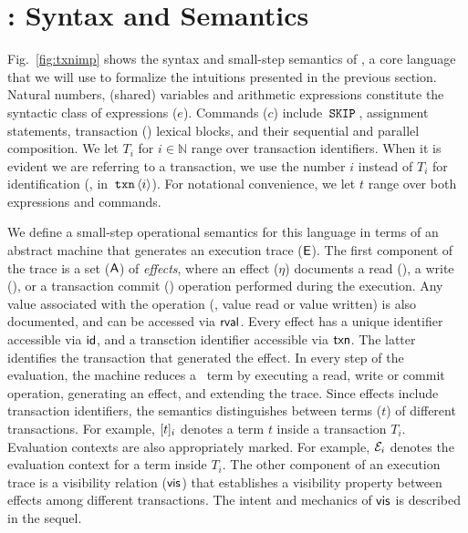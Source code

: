 \section{\txnimp: Syntax and Semantics}
\label{sec:opsem}

\label{sec:syntax}



Fig.~\ref{fig:txnimp} shows the syntax and small-step semantics of
\txnimp, a core language that we will use to formalize the intuitions
presented in the previous section. Natural numbers, (shared) variables
and arithmetic expressions constitute the syntactic class of
expressions ($e$).  Commands ($c$) include $\,{\tt SKIP}\,$, assignment
statements, transaction () lexical blocks, and their sequential
and parallel composition. We let $T_i$ for $i \in \mathbb{N}$ range
over transaction identifiers. When it is evident we are referring to a
transaction, we use the number $i$ instead of $T_i$ for identification
(\eg, in $\,{\tt txn}\,\langle i \rangle$). For notational convenience, we
let $t$ range over both expressions and commands.

We define a small-step operational semantics for this language in
terms of an abstract machine that generates an execution trace
($\textsf{E}$). The first component of the trace is a set ($\textsf{A}$) of
\emph{effects}, where an effect ($\eta$) documents a read (),
a write (), or a transaction commit () operation
performed during the execution. Any value associated with the
operation (\eg, value read or value written) is also documented, and
can be accessed via $\textsf{rval}$. Every effect has a unique identifier
accessible via $\textsf{id}$, and a transction identifier accessible via
$\textsf{txn}$.  The latter identifies the transaction that generated the
effect. In every step of the evaluation, the machine reduces a \txnimp\
term by executing a read, write or commit operation, generating an
effect, and extending the trace. Since effects include transaction
identifiers, the semantics distinguishes between terms ($t$) of
different transactions. For example, $\lbrack t \rbrack_i$ denotes a term $t$
inside a transaction $T_i$.  Evaluation contexts are also
appropriately marked. For example, $\mathcal{E}_i$ denotes the evaluation
context for a term inside $T_i$. The other component of an execution
trace is a visibility relation ($\textsf{vis}$) that establishes a visibility
property between effects among different transactions. The intent and
mechanics of $\textsf{vis}$ is described in the sequel.

